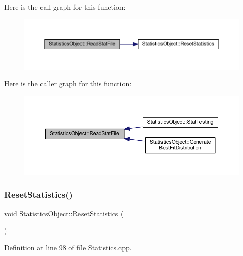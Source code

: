 Here is the call graph for this function\+:\nopagebreak
\begin{figure}[H]
\begin{center}
\leavevmode
\includegraphics[width=350pt]{class_statistics_object_a693fe5171d536953cc5545048716dcca_cgraph}
\end{center}
\end{figure}
Here is the caller graph for this function\+:\nopagebreak
\begin{figure}[H]
\begin{center}
\leavevmode
\includegraphics[width=350pt]{class_statistics_object_a693fe5171d536953cc5545048716dcca_icgraph}
\end{center}
\end{figure}
\mbox{\label{class_statistics_object_aafceb8d5caaffc3482e5f9be760fc953}} 
\subsubsection{\texorpdfstring{Reset\+Statistics()}{ResetStatistics()}}
{\footnotesize\ttfamily void Statistics\+Object\+::\+Reset\+Statistics (\begin{DoxyParamCaption}{ }\end{DoxyParamCaption})}



Definition at line 98 of file Statistics.\+cpp.

